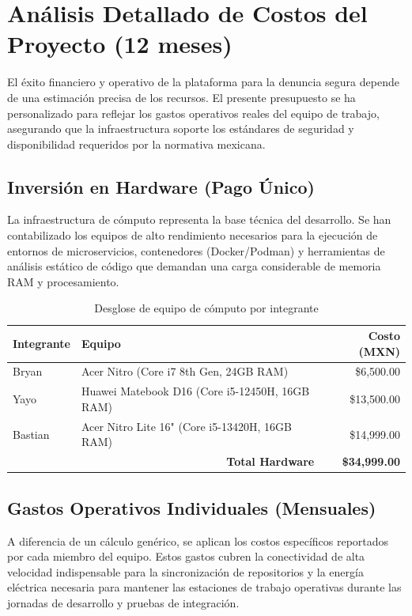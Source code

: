 \section{Análisis Detallado de Costos del Proyecto (12 meses)}

El éxito financiero y operativo de la plataforma para la denuncia segura depende de una estimación precisa de los recursos. El presente presupuesto se ha personalizado para reflejar los gastos operativos reales del equipo de trabajo, asegurando que la infraestructura soporte los estándares de seguridad y disponibilidad requeridos por la normativa mexicana.

\subsection{Inversión en Hardware (Pago Único)}

La infraestructura de cómputo representa la base técnica del desarrollo. Se han contabilizado los equipos de alto rendimiento necesarios para la ejecución de entornos de microservicios, contenedores (Docker/Podman) y herramientas de análisis estático de código que demandan una carga considerable de memoria RAM y procesamiento.

\begin{table}[h!]
\centering
\caption{Desglose de equipo de cómputo por integrante}
\begin{tabular}{|l|l|r|}
\hline
\textbf{Integrante} & \textbf{Equipo} & \textbf{Costo (MXN)} \\ \hline
Bryan & Acer Nitro (Core i7 8th Gen, 24GB RAM) & \$6,500.00 \\ \hline
Yayo & Huawei Matebook D16 (Core i5-12450H, 16GB RAM) & \$13,500.00 \\ \hline
Bastian & Acer Nitro Lite 16" (Core i5-13420H, 16GB RAM) & \$14,999.00 \\ \hline
\multicolumn{2}{|r|}{\textbf{Total Hardware}} & \textbf{\$34,999.00} \\ \hline
\end{tabular}
\end{table}

\subsection{Gastos Operativos Individuales (Mensuales)}

A diferencia de un cálculo genérico, se aplican los costos específicos reportados por cada miembro del equipo. Estos gastos cubren la conectividad de alta velocidad indispensable para la sincronización de repositorios y la energía eléctrica necesaria para mantener las estaciones de trabajo operativas durante las jornadas de desarrollo y pruebas de integración.

